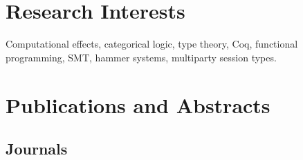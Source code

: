 \documentclass[a4paper,9pt]{article} %
\begin{document}





\section{Research Interests}

Computational effects, categorical logic, type theory, Coq, functional programming, SMT, hammer systems, multiparty session types.

{\vskip4mm}
\section{Publications and Abstracts}
{\vskip1mm}
\subsection*{Journals}
{\vskip1mm}
\end{document}
